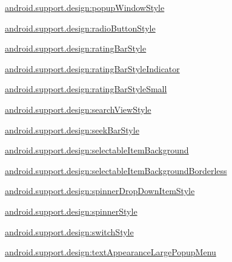 {\ttfamily \hyperlink{classandroid_1_1support_1_1design_1_1R_1_1styleable_a2f386a19b0732d76a79e7a070ee99feb}{android.\+support.\+design\+:popup\+Window\+Style}}

{\ttfamily \hyperlink{classandroid_1_1support_1_1design_1_1R_1_1styleable_abf40525373a47503a3a32d0d28968936}{android.\+support.\+design\+:radio\+Button\+Style}}

{\ttfamily \hyperlink{classandroid_1_1support_1_1design_1_1R_1_1styleable_a489467c128791a96f0a6869127a31cba}{android.\+support.\+design\+:rating\+Bar\+Style}}

{\ttfamily \hyperlink{classandroid_1_1support_1_1design_1_1R_1_1styleable_acb5f552d97fb774eb23c5a37ac305002}{android.\+support.\+design\+:rating\+Bar\+Style\+Indicator}}

{\ttfamily \hyperlink{classandroid_1_1support_1_1design_1_1R_1_1styleable_a2d2923d5071be320451a0bd71d92c8f6}{android.\+support.\+design\+:rating\+Bar\+Style\+Small}}

{\ttfamily \hyperlink{classandroid_1_1support_1_1design_1_1R_1_1styleable_a7f20a034b36b7ab747f54d15503472b8}{android.\+support.\+design\+:search\+View\+Style}}

{\ttfamily \hyperlink{classandroid_1_1support_1_1design_1_1R_1_1styleable_a3a0b8e9f055894c1859484655adc6db6}{android.\+support.\+design\+:seek\+Bar\+Style}}

{\ttfamily \hyperlink{classandroid_1_1support_1_1design_1_1R_1_1styleable_ad98a8eb57d72c1fb3c3e08668a810c3c}{android.\+support.\+design\+:selectable\+Item\+Background}}

{\ttfamily \hyperlink{classandroid_1_1support_1_1design_1_1R_1_1styleable_aece61d63468a2001739bbddff229db4f}{android.\+support.\+design\+:selectable\+Item\+Background\+Borderless}}

{\ttfamily \hyperlink{classandroid_1_1support_1_1design_1_1R_1_1styleable_a762707a1c6a6aa1a8ef4921392a1718d}{android.\+support.\+design\+:spinner\+Drop\+Down\+Item\+Style}}

{\ttfamily \hyperlink{classandroid_1_1support_1_1design_1_1R_1_1styleable_a2acd7c3695b4d10f59e576bf69cfb846}{android.\+support.\+design\+:spinner\+Style}}

{\ttfamily \hyperlink{classandroid_1_1support_1_1design_1_1R_1_1styleable_a3990aa9db190f4ae9a7169c7f468bcb7}{android.\+support.\+design\+:switch\+Style}}

{\ttfamily \hyperlink{classandroid_1_1support_1_1design_1_1R_1_1styleable_a9ce465853ff5c3303afda4d0d788d041}{android.\+support.\+design\+:text\+Appearance\+Large\+Popup\+Menu}}

